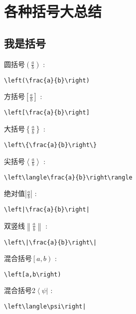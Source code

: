 \documentclass[11pt,a4paper,UTF8,openany]{ctexbook}
\begin{document}
\chapter{各种括号大总结}
\section{我是括号}
\noindent 圆括号$\left(\frac{a}{b}\right)$ : 
\begin{verbatim}\left(\frac{a}{b}\right)\end{verbatim}
方括号$\left[\frac{a}{b}\right]$ : 
\begin{verbatim}\left[\frac{a}{b}\right]\end{verbatim}
大括号$\left\{\frac{a}{b}\right\}$ :
\begin{verbatim}\left\{\frac{a}{b}\right\}\end{verbatim}
尖括号$\left\langle\frac{a}{b}\right\rangle$ :
\begin{verbatim}\left\langle\frac{a}{b}\right\rangle\end{verbatim}
绝对值$\left|\frac{a}{b}\right|$ :
\begin{verbatim}\left|\frac{a}{b}\right|\end{verbatim}
双竖线$\left\|\frac{a}{b}\right\|$ :
\begin{verbatim}\left\|\frac{a}{b}\right\|\end{verbatim}
混合括号$\left[a,b\right)$ :
\begin{verbatim}\left[a,b\right)\end{verbatim}
混合括号2$\left\langle\psi\right|$ :
\begin{verbatim}\left\langle\psi\right|\end{verbatim}
\end{document}
